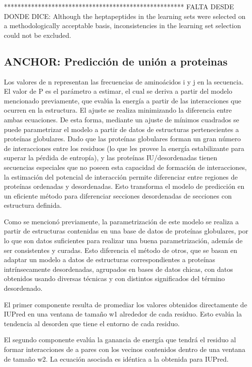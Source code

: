 *****************************************************
FALTA DESDE DONDE DICE:  Although the heptapeptides in the learning sets were selected on a methodologically acceptable basis, inconsistencies in the learning set selection could not be excluded.





 
\subsection{ANCHOR: Predicción de unión a proteinas}
Los valores de n representan las frecuencias de aminoácidos i y j en la secuencia.
El valor de P es el parámetro a estimar, el cual se deriva a partir del modelo mencionado previamente, que evalúa la energía a partir de las interacciones que ocurren en la estructura. 
El ajuste se realiza minimizando la diferencia entre ambas ecuaciones.
De esta forma, mediante un ajuste de mínimos cuadrados se puede parametrizar el modelo a partir de datos de estructuras pertenecientes a proteínas globulares.
Dado que las proteínas globulares forman un gran número de interacciones entre los residuos (lo que les provee la energía estabilizante para superar la pérdida de entropía), 
y las proteínas IU/desordenadas tienen secuencias especiales que no poseen esta capacidad de formación de interacciones, la estimación del potencial de interacción permite diferenciar entre
regiones de proteínas ordenadas y desordenadas. Esto transforma el modelo de predicción en un eficiente método para diferenciar secciones desordenadas de secciones con estructura definida.

Como se mencionó previamente, la parametrización de este modelo se realiza a partir de estructuras contenidas en una base de datos de proteínas globulares, por lo que son datos suficientes
para realizar una buena parametrización, además de ser consistentes y curadas. Esto diferencia el método de otros, que se basan en adaptar un modelo a datos de estructuras correspondientes
a proteínas intrínsecamente desordenadas, agrupados en bases de datos chicas, con datos obtenidos usando diversas técnicas y con distintos significados del término desordenado.

El primer componente resulta de promediar los valores obtenidos directamente de IUPred en una ventana de tamaño w1 alrededor de cada residuo. Esto evalúa la tendencia al desorden
que tiene el entorno de cada residuo.

El segundo componente evalúa la ganancia de energía que tendrá el residuo al formar interacciones de a pares con los vecinos contenidos dentro de una ventana de tamaño w2. 
La ecuación asociada es idéntica a la obtenida para IUPred.

